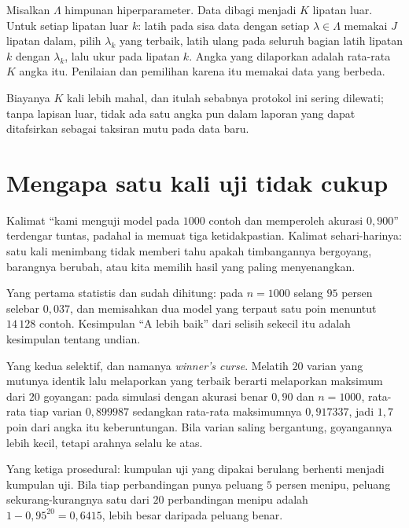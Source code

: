 \begin{definisi}
Misalkan $\Lambda$ himpunan hiperparameter. Data dibagi menjadi $K$ lipatan luar. Untuk
setiap lipatan luar $k$: latih pada sisa data dengan setiap $\lambda\in\Lambda$ memakai
$J$ lipatan dalam, pilih $\lambda_k$ yang terbaik, latih ulang pada seluruh bagian latih
lipatan $k$ dengan $\lambda_k$, lalu ukur pada lipatan $k$. Angka yang dilaporkan adalah
rata-rata $K$ angka itu. Penilaian dan pemilihan karena itu memakai data yang berbeda.
\end{definisi}

Biayanya $K$ kali lebih mahal, dan itulah sebabnya protokol ini sering dilewati; tanpa
lapisan luar, tidak ada satu angka pun dalam laporan yang dapat ditafsirkan sebagai
taksiran mutu pada data baru.

\section{Mengapa satu kali uji tidak cukup}

Kalimat ``kami menguji model pada $1000$ contoh dan memperoleh akurasi $0{,}900$''
terdengar tuntas, padahal ia memuat tiga ketidakpastian. Kalimat sehari-harinya:
satu kali menimbang tidak memberi tahu apakah timbangannya bergoyang, barangnya
berubah, atau kita memilih hasil yang paling menyenangkan.

Yang pertama statistis dan sudah dihitung: pada $n=1000$ selang $95$ persen selebar
$0{,}037$, dan memisahkan dua model yang terpaut satu poin menuntut $14\,128$ contoh.
Kesimpulan ``A lebih baik'' dari selisih sekecil itu adalah kesimpulan tentang undian.

Yang kedua selektif, dan namanya \emph{winner's curse}. Melatih $20$ varian yang mutunya
identik lalu melaporkan yang terbaik berarti melaporkan maksimum dari $20$ goyangan: pada
simulasi dengan akurasi benar $0{,}90$ dan $n=1000$, rata-rata tiap varian $0{,}899987$
sedangkan rata-rata maksimumnya $0{,}917337$, jadi $1{,}7$ poin dari angka itu
keberuntungan. Bila varian saling bergantung, goyangannya lebih kecil, tetapi arahnya
selalu ke atas.

Yang ketiga prosedural: kumpulan uji yang dipakai berulang berhenti menjadi kumpulan uji.
Bila tiap perbandingan punya peluang $5$ persen menipu, peluang sekurang-kurangnya satu
dari $20$ perbandingan menipu adalah $1-0{,}95^{20}=0{,}6415$, lebih besar daripada peluang
benar.

